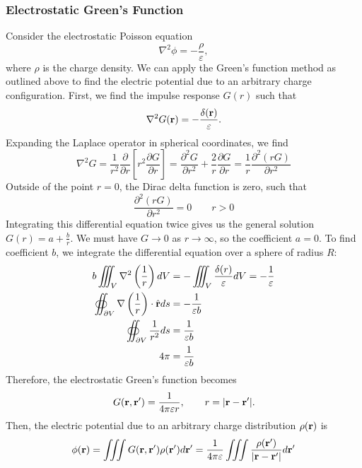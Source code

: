 \subsubsection{Electrostatic Green's Function}
Consider the electrostatic Poisson equation
\begin{equation}
	\nabla^2 \phi = -\frac{\rho}{\varepsilon},
\end{equation}
where $\rho$ is the charge density. We can apply the Green's function method as outlined above to find the electric potential due to an arbitrary charge configuration. First, we find the impulse response $G(r)$ such that
\begin{equation}
	\nabla^2 G(\mathbf{r}) = -\frac{\delta(\mathbf{r})}{\varepsilon}.
\end{equation}
Expanding the Laplace operator in spherical coordinates, we find
\begin{equation*}
	\nabla^2 G = \frac{1}{r^2} \frac{\partial}{\partial r} \left[ r^2 \frac
	{\partial G}{\partial r} \right] = \frac{\partial^2 G}{\partial r^2} + \frac{2}{r} \frac{\partial G}{\partial r} = \frac{1}{r} \frac{\partial^2 (r G)}{\partial r^2}
\end{equation*}
Outside of the point $r = 0$, the Dirac delta function is zero, such that
\begin{equation}
	\frac{\partial^2 (r G)}{\partial r^2} = 0 \qquad r > 0
\end{equation}
Integrating this differential equation twice gives us the general solution $G(r) = a + \frac{b}{r}$. We must have $G \to 0$ as $r \to \infty$, so the coefficient $a = 0$. To find coefficient $b$, we integrate the differential equation over a sphere of radius $R$:
\begin{align*}
	b \iiint_{V} \nabla^2 \left( \frac{1}{r} \right) dV & = - \iiint_V \frac{\delta(r)}{\varepsilon} dV = -\frac{1}{\varepsilon} \\
	\oiint_{\partial V} \nabla \left( \frac{1}{r} \right) \cdot \hat{\mathbf{r}} ds & = -\frac{1}{\varepsilon b} \\
	\oiint_{\partial V} \frac{1}{r^2} ds & = \frac{1}{\varepsilon b} \\
	4\pi & = \frac{1}{\varepsilon b}
\end{align*}
Therefore, the electrostatic Green's function becomes
\begin{equation}
	G(\mathbf{r}, \mathbf{r}^\prime) = \frac{1}{4\pi \varepsilon r}, \qquad r = |\mathbf{r} - \mathbf{r}^\prime|.
\end{equation}
Then, the electric potential due to an arbitrary charge distribution $\rho(\mathbf{r})$ is 
\begin{equation}
	\phi(\mathbf{r}) = \iiint G(\mathbf{r}, \mathbf{r}^\prime) \rho(\mathbf{r}^\prime) d\mathbf{r}^\prime = \frac{1}{4\pi\varepsilon} \iiint \frac{\rho(\mathbf{r}^\prime)}{|\mathbf{r} - \mathbf{r}^\prime|} d\mathbf{r}^\prime
\end{equation}

